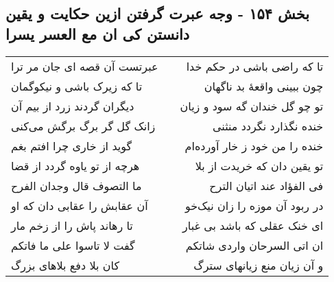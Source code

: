 \begin{center}
\section*{بخش ۱۵۴ - وجه عبرت گرفتن ازین حکایت و یقین دانستن کی ان مع العسر یسرا}
\label{sec:sh154}
\begin{longtable}{l p{0.5cm} r}
عبرتست آن قصه ای جان مر ترا
&&
تا که راضی باشی در حکم خدا
\\
تا که زیرک باشی و نیکوگمان
&&
چون ببینی واقعهٔ بد ناگهان
\\
دیگران گردند زرد از بیم آن
&&
تو چو گل خندان گه سود و زیان
\\
زانک گل گر برگ برگش می‌کنی
&&
خنده نگذارد نگردد منثنی
\\
گوید از خاری چرا افتم بغم
&&
خنده را من خود ز خار آورده‌ام
\\
هرچه از تو یاوه گردد از قضا
&&
تو یقین دان که خریدت از بلا
\\
ما التصوف قال وجدان الفرح
&&
فی الفؤاد عند اتیان الترح
\\
آن عقابش را عقابی دان که او
&&
در ربود آن موزه را زان نیک‌خو
\\
تا رهاند پاش را از زخم مار
&&
ای خنک عقلی که باشد بی غبار
\\
گفت لا تاسوا علی ما فاتکم
&&
ان اتی السرحان واردی شاتکم
\\
کان بلا دفع بلاهای بزرگ
&&
و آن زیان منع زیانهای سترگ
\\
\end{longtable}
\end{center}
